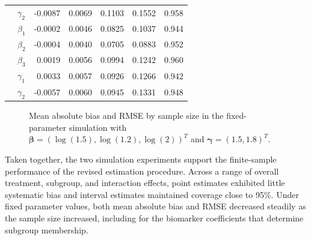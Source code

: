 \begin{table}[!htbp]
\begin{tabular}{clrrrrr}
& $\gamma_2$  & -0.0087 & 0.0069 & 0.1103 & 0.1552 & 0.958 \\
\addlinespace
1400
& $\beta_1$  & -0.0002 & 0.0046 & 0.0825 & 0.1037 & 0.944 \\
& $\beta_2$   & -0.0004 & 0.0040 & 0.0705 & 0.0883 & 0.952 \\
& $\beta_3$   &  0.0019 & 0.0056 & 0.0994 & 0.1242 & 0.960 \\
& $\gamma_1$  &  0.0033 & 0.0057 & 0.0926 & 0.1266 & 0.942 \\
& $\gamma_2$  & -0.0057 & 0.0060 & 0.0945 & 0.1331 & 0.948 \\
\bottomrule
\end{tabular}
\label{tab:simuResFixedN}
\end{table}

\begin{figure}[!htbp]
    \centering
    \caption[Estimation error by sample size in the fixed-parameter simulation]{Mean absolute bias and RMSE by sample size in the fixed-parameter simulation with $\boldsymbol\beta=(\log(1.5),\log(1.2),\log(2))^{T}$ and $\boldsymbol\gamma=(1.5,1.8)^{T}$.}
    \label{fig:simuBiasByN}
\end{figure}

Taken together, the two simulation experiments support the finite-sample performance of the revised estimation procedure. Across a range of overall treatment, subgroup, and interaction effects, point estimates exhibited little systematic bias and interval estimates maintained coverage close to 95\%. Under fixed parameter values, both mean absolute bias and RMSE decreased steadily as the sample size increased, including for the biomarker coefficients that determine subgroup membership.
